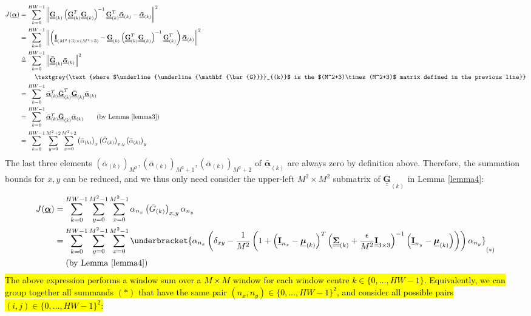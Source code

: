 \documentclass{article}
\def\vt#1{\underline{\mathbf{#1}}}
\def\vts#1{\underline{\boldsymbol{#1}}}
\def\mt#1{\underline{\underline{\mathbf{#1}}}}
\def\mts#1{\underline{\underline{\boldsymbol{#1}}}}
\begin{document}
\begin{align*}
    J(\vts\alpha) &=  \sum_{k=0}^{HW-1} \left\| \mt G_{(k)}\left(\mt G_{(k)}^T \mt G_{(k)} \right)^{-1} \mt G_{(k)}^T \vts{\bar{\alpha}}_{(k)}  - \vts{\bar{\alpha}}_{(k)} \right\|^2\\
    &=  \sum_{k=0}^{HW-1} \left\| \left(\mt I_{(M^2+3)\times(M^2+3)} -  \mt G_{(k)}\left(\mt G_{(k)}^T \mt G_{(k)} \right)^{-1} \mt G_{(k)}^T \right) \vts{\bar{\alpha}}_{(k)}   \right\|^2\\
    &\triangleq  \sum_{k=0}^{HW-1} \left\| \mt{\bar{G}}_{(k)} \vts{\bar{\alpha}}_{(k)}   \right\|^2\\
    &\quad\quad\ \textgrey{\text{where $\mt{\bar{G}}_{(k)}$ is the $(M^2+3)\times(M^2+3)$ matrix defined in the previous line}}\\
    &= \sum_{k=0}^{HW-1} \vts{\bar{\alpha}}_{(k)}^T \mt{\bar{G}}_{(k)}^T \mt{\bar{G}}_{(k)} \vts{\bar{\alpha}}_{(k)}\\
    &= \sum_{k=0}^{HW-1} \vts{\bar{\alpha}}_{(k)}^T  \mt{\bar{G}}_{(k)} \vts{\bar{\alpha}}_{(k)} \qquad\text{(by Lemma \ref{lemma3})}\\
    &= \sum_{k=0}^{HW-1} \sum_{y=0}^{M^2+2} \sum_{x=0}^{M^2+2} \left({\bar{\alpha}}_{(k)}\right)_x  \left({\bar{G}}_{(k)}\right)_{x,y} \left({\bar{\alpha}}_{(k)}\right)_y
\end{align*}
The last three elements $\left({\bar{\alpha}}_{(k)}\right)_{M^2}, \left({\bar{\alpha}}_{(k)}\right)_{M^2+1}, \left({\bar{\alpha}}_{(k)}\right)_{M^2+2}$ of $\vts{\bar{\alpha}}_{(k)}$ are always zero by definition above. Therefore, the summation bounds for $x,y$ can be reduced, and we thus only need consider the upper-left $M^2\times M^2$ submatrix of ${\mt{\bar{G}}}_{(k)}$ in Lemma \ref{lemma4}:
\begin{align*}
    J(\vts\alpha) &= \sum_{k=0}^{HW-1} \sum_{y=0}^{M^2-1} \sum_{x=0}^{M^2-1} \alpha_{n_x}  \left({\bar{G}}_{(k)}\right)_{x,y} \alpha_{n_y}\\
    &= \sum_{k=0}^{HW-1} \sum_{y=0}^{M^2-1} \sum_{x=0}^{M^2-1} \underbracket{\alpha_{n_x}  \left( \delta_{xy} - \frac1{M^2}\left(1 + \left(\vt{I}_{n_x} - \vts \mu_{(k)}\right)^T \left(\mts \Sigma_{(k)} + \frac\epsilon{M^2} \mt{I}_{3\times 3}\right)^{-1} \left(\vt{I}_{n_y} - \vts \mu_{(k)}\right) \right) \right) \alpha_{n_y}}_{(*)}\\
    &\quad\ \text{(by Lemma \ref{lemma4})}
\end{align*}
\hl{The above expression performs a window sum over a $M\times M$ window for each window centre $k\in\{0,\dots,HW-1\}$. Equivalently, we can group together all summands $(*)$ that have the same pair $(n_x,n_y)\in\{0,\dots,HW-1\}^2$, and consider all possible pairs $(i,j)\in\{0,\dots,HW-1\}^2$:}
\end{document}
